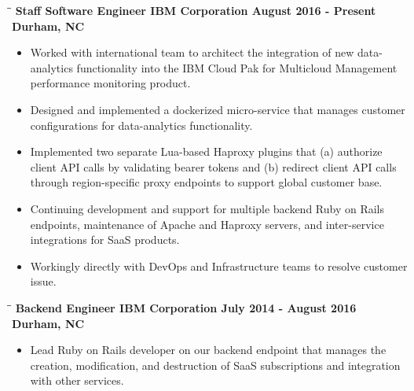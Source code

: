 \documentclass[8pt]{res}
\begin{document}
\begin{resume}
    \begin{tabbing}
      \hspace{2.3in}\= \hspace{2.6in}\= \kill %
      \bf Staff Software Engineer \>\bf IBM Corporation \>\bf August 2016 - Present\\ \>\bf Durham, NC
    \end{tabbing}\vspace{-10pt}      %
    \begin{itemize}
      \item Worked with international team to architect the integration of new data-analytics functionality into the IBM Cloud Pak for Multicloud Management performance monitoring product.
      \item Designed and implemented a dockerized micro-service that manages customer configurations for data-analytics functionality.
      \item Implemented two separate Lua-based Haproxy plugins that (a) authorize client API calls by validating bearer tokens and (b) redirect client API calls through region-specific proxy endpoints to support global customer base.
      \item Continuing development and support for multiple backend Ruby on Rails endpoints, maintenance of Apache and Haproxy servers, and inter-service integrations for SaaS products.
      \item Workingly directly with DevOps and Infrastructure teams to resolve customer issue.
    \end{itemize}\vspace{-18pt}      %
    \begin{tabbing}
      \hspace{2.3in}\= \hspace{2.6in}\= \kill %
      \bf Backend Engineer \>\bf IBM Corporation \>\bf July 2014 - August 2016\\ \>\bf Durham, NC
    \end{tabbing}\vspace{-10pt}      %
    \begin{itemize}
      \item Lead Ruby on Rails developer on our backend endpoint that manages the creation, modification, and destruction of SaaS subscriptions and integration with other services.

\end{itemize}
\end{resume}
\end{document}
